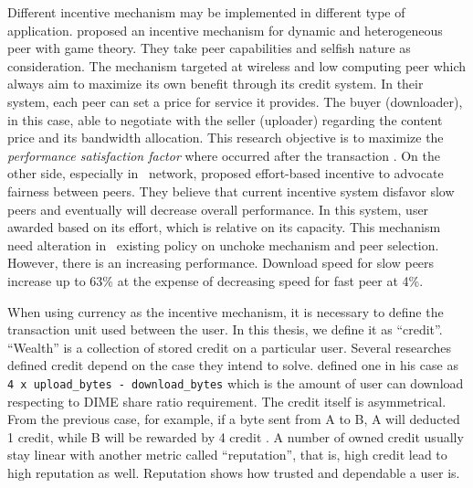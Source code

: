 Different incentive mechanism may be implemented in different type of application. \citeauthor{2015:incentivep2pgame:kang} proposed an incentive mechanism for dynamic and heterogeneous peer with game theory. They take peer capabilities and selfish nature as consideration. The mechanism targeted at wireless and low computing peer which always aim to maximize its own benefit through its credit system. In their system, each peer can set a price for service it provides. The buyer (downloader), in this case, able to negotiate with the seller (uploader) regarding the content price and its bandwidth allocation. This research objective is to maximize the \textit{performance satisfaction factor} where occurred after the transaction \cite{2015:incentivep2pgame:kang}. On the other side, especially in \bt~network, \citeauthor{2010:effortincentive:rahman} proposed effort-based incentive to advocate fairness between peers. They believe that current incentive system disfavor slow peers and eventually will decrease overall performance. In this system, user awarded based on its effort, which is relative on its capacity. This mechanism need alteration in \bt~existing policy on unchoke mechanism and peer selection. However, there is an increasing performance. Download speed for slow peers increase up to 63\% at the expense of decreasing speed for fast peer at 4\%.

When using currency as the incentive mechanism, it is necessary to define the transaction unit used between the user. In this thesis, we define it as ``credit''. ``Wealth'' is a collection of stored credit on a particular user. Several researches defined credit depend on the case they intend to solve. \citeauthor{2012:economicbt:kash} defined one in his case as \texttt{4 x upload\_bytes - download\_bytes} which is the amount of user can download respecting to DIME share ratio requirement. The credit itself is asymmetrical. From the previous case, for example, if a byte sent from A to B, A will deducted 1 credit, while B will be rewarded by 4 credit \cite{2012:economicbt:kash}. A number of owned credit usually stay linear with another metric called ``reputation'', that is, high credit lead to high reputation as well. Reputation shows how trusted and dependable a user is. 


